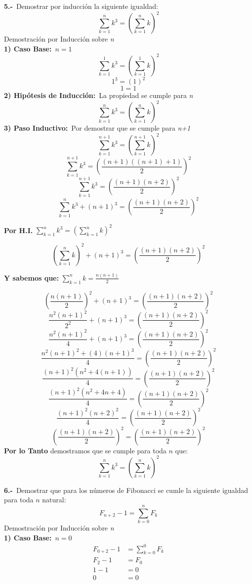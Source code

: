 \documentclass{article}
\begin{document}
\newpage
\textbf{5.-}\ Demostrar por inducción la siguiente igualdad:
\[
\sum_{k=1}^{n}k^{3} = \left(\sum_{k=1}^{n}k\right)^{2}
\]
\newline
Demostración por Inducción sobre \textit{n}\\
\newline
\textbf{1) Caso Base:}\ $n = 1$
\[
\sum_{k=1}^{1}k^{3} = \left(\sum_{k=1}^{1}k\right)^{2}
\]
\[
1^{3} = (1)^{2}
\]
\[
1 = 1
\]
\textbf{2) Hipótesis de Inducción:}\  La propiedad se cumple para \textit{n}\
\[
\sum_{k=1}^{n}k^{3} = \left(\sum_{k=1}^{n}k\right)^{2}
\]
\textbf{3) Paso Inductivo:}\  Por demostrar que se cumple para \textit{n+1}\
\[
\sum_{k=1}^{n+1}k^{3} = \left(\sum_{k=1}^{n+1}k\right)^{2}
\]
\[
\sum_{k=1}^{n+1}k^{3} = \left(\frac{(n+1)((n+1)+1)}{2}\right)^{2}
\]
\[
\sum_{k=1}^{n+1}k^{3} = \left(\frac{(n+1)(n+2)}{2}\right)^{2}
\]
\[
\sum_{k=1}^{n}k^{3} + (n+1)^{3}= \left(\frac{(n+1)(n+2)}{2}\right)^{2}
\]
\begin{center}
\textbf{Por H.I.} $\sum_{k=1}^{n}k^{3} = \left(\sum_{k=1}^{n}k\right)^{2}$
\end{center}
\[
\left(\sum_{k=1}^{n}k\right)^{2} + (n+1)^{3}= \left(\frac{(n+1)(n+2)}{2}\right)^{2}
\]
\begin{center}
\textbf{Y sabemos que:} $\sum_{k=1}^{n}k= \frac{n(n+1)}{2}$
\end{center}
\[
\left(\frac{n(n+1)}{2}\right)^{2} + (n+1)^{3} = \left(\frac{(n+1)(n+2)}{2}\right)^{2}
\]
\[
\frac{n^{2}(n+1)^{2}}{2^{2}} + (n+1)^{3} = \left(\frac{(n+1)(n+2)}{2}\right)^{2}
\]
\[
\frac{n^{2}(n+1)^{2}}{4} + (n+1)^{3} = \left(\frac{(n+1)(n+2)}{2}\right)^{2}
\]
\[
\frac{{n^{2}(n+1)^{2}} + (4)(n+1)^{3}}{4} = \left(\frac{(n+1)(n+2)}{2}\right)^{2}
\]
\[
\frac{(n+1)^{2}(n^{2}+4(n+1))}{4} = \left(\frac{(n+1)(n+2)}{2}\right)^{2}
\]
\[
\frac{(n+1)^{2}(n^{2}+4n+4)}{4} = \left(\frac{(n+1)(n+2)}{2}\right)^{2}
\]
\[
\frac{(n+1)^{2}(n+2)^{2}}{4} = \left(\frac{(n+1)(n+2)}{2}\right)^{2}
\]
\[
\left(\frac{(n+1)(n+2)}{2}\right)^{2} = \left(\frac{(n+1)(n+2)}{2}\right)^{2}
\]
\newline
\textbf{Por lo Tanto} demostramos que se cumple para toda $n$ que:
\[
\sum_{k=1}^{n}k^{3} = \left(\sum_{k=1}^{n}k\right)^{2}
\]


\newpage 
\textbf{6.-}\ Demostrar que para los números de Fibonacci se cumle la siguiente igualdad para toda $n$ natural:
\[
F_{n+2} - 1 = \sum_{k=0}^{n}F_{k}
\]
\newline
Demostración por Inducción sobre \textit{n}\\
\newline
\textbf{1) Caso Base:}\ $n = 0$
\begin{align*}
F_{0+2} - 1 & = \sum_{k=0}^{0}F_{k} \\
F_{2} - 1 & = F_{0} \\
1 - 1 & = 0 \\
0 & = 0 \\
\end{align*}
\end{document}
